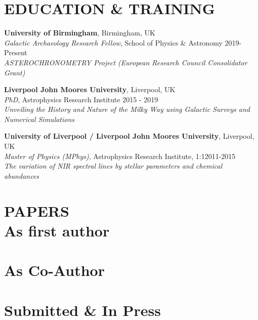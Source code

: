 \documentclass[margin]{res}
\begin{document}
\begin{resume}
\section{EDUCATION \& TRAINING}
\textbf{University of Birmingham}, Birmingham, UK\\
{\sl Galactic Archaeology Research Fellow}, School of Physics \& Astronomy \hfill 2019-Present\\
\emph{ASTEROCHRONOMETRY Project (European Research Council Consolidator Grant)}

\textbf{Liverpool John Moores University}, Liverpool, UK\\
{\sl PhD}, Astrophysics Research Institute \hfill 2015 - 2019\\
\emph{Unveiling the History and Nature of the Milky Way using Galactic Surveys and Numerical Simulations}

\textbf{University of Liverpool / Liverpool John Moores University}, Liverpool, UK\\
{\sl Master of Physics (MPhys)}, Astrophysics Research Institute, 1:1\hfill 2011-2015
\\
\emph{The variation of NIR spectral lines by stellar parameters and chemical abundances}


\section{PAPERS\\ As first author}
\hspace{1.3cm}
\textit{{}}
\vspace{0.1cm}
\begin{itemize}

\end{itemize}
\section{As Co-Author}
\begin{itemize}

\end{itemize}
\section{Submitted \& In Press}
\begin{itemize}

\end{itemize}

\end{resume}
\end{document}
